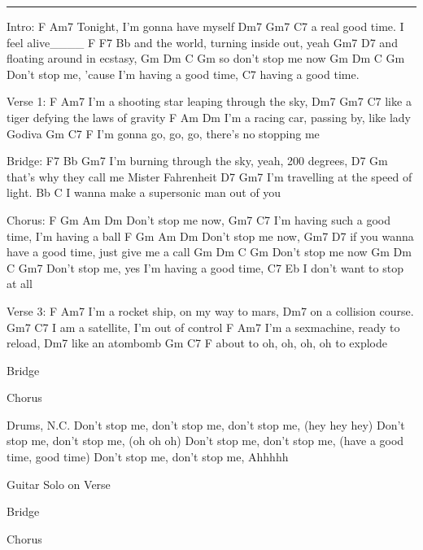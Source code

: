 \noindent\rule{\columnwidth}{1pt}
\begin{multicols}{2}
\begin{lstsong}
Intro:
   F                      Am7
Tonight, I'm gonna have myself
        Dm7              Gm7    C7
a real good time. I feel alive____
        F       F7            Bb
and the world, turning inside out, yeah
     Gm7               D7
and floating around in ecstasy, 
   Gm    Dm   C  Gm
so don't stop me now
 Gm   Dm   C               Gm
Don't stop me, 'cause I'm having a good time,
C7
having a good time.

Verse 1:
      F                                 Am7
I'm a shooting star leaping through the sky,
       Dm7               Gm7         C7
like a tiger defying the laws of gravity
      F                   Am              Dm
I'm a racing car, passing by, like lady Godiva
         Gm         C7                    F
I'm gonna go, go, go, there's no stopping me

Bridge:
    F7                  Bb          Gm7
I'm burning through the sky, yeah, 200 degrees,
                D7                   Gm
that's why they call me Mister Fahrenheit
     D7                         Gm7
I'm travelling at the speed of light.
                Bb                    C
I wanna make a supersonic man out of you












Chorus:
F     Gm   Am Dm
Don't stop me now,
                      Gm7         C7
I'm having such a good time, I'm having a ball
F     Gm   Am Dm
Don't stop me now,
                     Gm7             D7
if you wanna have a good time, just give me a call
Gm    Dm   C  Gm
Don't stop me now
Gm    Dm   C            Gm7
Don't stop me, yes I'm having a good time, 
  C7                    Eb
I don't want to stop at all

Verse 3:
      F                         Am7
I'm a rocket ship, on my way to mars,
      Dm7
on a collision course.
        Gm7            C7
I am a satellite, I'm out of control
      F                      Am7
I'm a sexmachine, ready to reload,
        Dm7
like an atombomb
         Gm          C7        F
about to oh, oh, oh, oh to explode

Bridge

Chorus

Drums, N.C.
Don't stop me, don't stop me, don't stop me, 
 (hey hey hey)
Don't stop me, don't stop me, (oh oh oh)
Don't stop me, don't stop me, 
 (have a good time, good time)
Don't stop me, don't stop me, Ahhhhh

Guitar Solo on Verse

Bridge

Chorus
\end{lstsong}
\end{multicols}
\newpage

